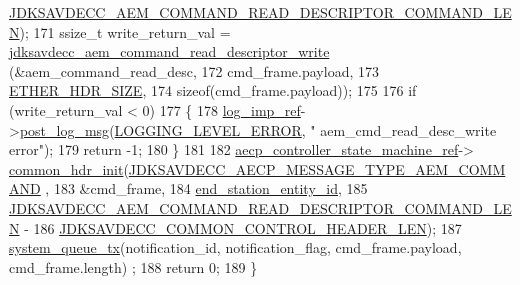 \begin{DoxyCode}
      \hyperlink{group__command__read__descriptor_gac688b92a5f2db14b588702961884f6a3}{JDKSAVDECC\_AEM\_COMMAND\_READ\_DESCRIPTOR\_COMMAND\_LEN});
171     ssize\_t write\_return\_val = \hyperlink{group__command__read__descriptor_gade3ca50a535aaef541561a6ea62d2ca0}{jdksavdecc\_aem\_command\_read\_descriptor\_write}
      (&aem\_command\_read\_desc,
172                                                                             cmd\_frame.payload,
173                                                                             
      \hyperlink{namespaceavdecc__lib_a6c827b1a0d973e18119c5e3da518e65ca9512ad9b34302ba7048d88197e0a2dc0}{ETHER\_HDR\_SIZE},
174                                                                             \textcolor{keyword}{sizeof}(cmd\_frame.payload));
175 
176     \textcolor{keywordflow}{if} (write\_return\_val < 0)
177     \{
178         \hyperlink{namespaceavdecc__lib_acbe3e2a96ae6524943ca532c87a28529}{log\_imp\_ref}->\hyperlink{classavdecc__lib_1_1log_a68139a6297697e4ccebf36ccfd02e44a}{post\_log\_msg}(\hyperlink{namespaceavdecc__lib_a501055c431e6872ef46f252ad13f85cdaf2c4481208273451a6f5c7bb9770ec8a}{LOGGING\_LEVEL\_ERROR}, \textcolor{stringliteral}{"
      aem\_cmd\_read\_desc\_write error"});
179         \textcolor{keywordflow}{return} -1;
180     \}
181 
182     \hyperlink{namespaceavdecc__lib_a0b1b5aea3c0490f77cbfd9178af5be22}{aecp\_controller\_state\_machine\_ref}->
      \hyperlink{classavdecc__lib_1_1aecp__controller__state__machine_aafc737d7ed17a62fed9df6528f18d3ec}{common\_hdr\_init}(\hyperlink{group__aecp__message__type_ga4625ce189cc209f42deb0629f48faf69}{JDKSAVDECC\_AECP\_MESSAGE\_TYPE\_AEM\_COMMAND}
      ,
183                                                        &cmd\_frame,
184                                                        \hyperlink{classavdecc__lib_1_1end__station__imp_ac32ac278fb799e1b4f0cd539e0abe2b5}{end\_station\_entity\_id},
185                                                        
      \hyperlink{group__command__read__descriptor_gac688b92a5f2db14b588702961884f6a3}{JDKSAVDECC\_AEM\_COMMAND\_READ\_DESCRIPTOR\_COMMAND\_LEN} -
186                                                            
      \hyperlink{group__jdksavdecc__avtp__common__control__header_gaae84052886fb1bb42f3bc5f85b741dff}{JDKSAVDECC\_COMMON\_CONTROL\_HEADER\_LEN});
187     \hyperlink{namespaceavdecc__lib_a6dd511685627c0865a3442b539a4e8e9}{system\_queue\_tx}(notification\_id, notification\_flag, cmd\_frame.payload, cmd\_frame.length)
      ;
188     \textcolor{keywordflow}{return} 0;
189 \}
\end{DoxyCode}


